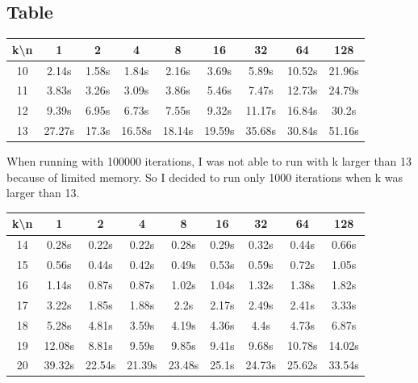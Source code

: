 \documentclass[a4paper]{extarticle}
\begin{document}
\subsection{Table}
\begin{center}
  \begin{tabular}{ c | | c | c | c | c | c | c | c | c | }
  	k\textbackslash  n & 1 & 2 & 4 & 8 & 16 & 32 & 64 & 128 \\ \hline
    \hline
    10 & 2.14s & 1.58s & 1.84s & 2.16s & 3.69s & 5.89s & 10.52s & 21.96s \\ \hline 
    11 & 3.83s & 3.26s & 3.09s & 3.86s & 5.46s & 7.47s & 12.73s & 24.79s \\ \hline 
    12 & 9.39s & 6.95s & 6.73s & 7.55s & 9.32s & 11.17s & 16.84s & 30.2s \\ \hline 
    13 & 27.27s & 17.3s & 16.58s & 18.14s & 19.59s & 35.68s & 30.84s & 51.16s \\
    \hline
  \end{tabular}
\end{center}

When running with 100000 iterations, I was not able to run with k larger than 13 because of limited memory. So I decided to run only 1000 iterations when k was larger than 13.

\begin{center}
  \begin{tabular}{ c | | c | c | c | c | c | c | c | c | }
  	k\textbackslash  n & 1 & 2 & 4 & 8 & 16 & 32 & 64 & 128 \\ \hline
    \hline
    14 & 0.28s & 0.22s & 0.22s & 0.28s & 0.29s & 0.32s & 0.44s & 0.66s \\ \hline 
    15 & 0.56s & 0.44s & 0.42s & 0.49s & 0.53s & 0.59s & 0.72s & 1.05s \\ \hline 
    16 & 1.14s & 0.87s & 0.87s & 1.02s & 1.04s & 1.32s & 1.38s & 1.82s \\ \hline 
    17 & 3.22s & 1.85s & 1.88s & 2.2s & 2.17s & 2.49s & 2.41s & 3.33s \\ \hline 
    18 & 5.28s & 4.81s & 3.59s & 4.19s & 4.36s & 4.4s & 4.73s & 6.87s \\ \hline 
    19 & 12.08s & 8.81s & 9.59s & 9.85s & 9.41s & 9.68s & 10.78s & 14.02s \\ \hline 
    20 & 39.32s & 22.54s & 21.39s & 23.48s & 25.1s & 24.73s & 25.62s & 33.54s \\
    \hline
  \end{tabular}
\end{center}
\end{document}
